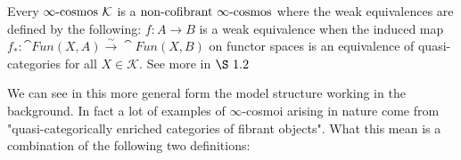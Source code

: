 \begin{rmk}\label{remarkabout}
    Every $\infty\text{-cosmos} \ \mathcal{K}$ is a $\text{non-cofibrant }\infty\text{-cosmos}$ where the weak equivalences are defined by the following: $f : A \rightarrow B$ is a weak equivalence when the induced map $f_*: \cat{Fun(X,A)}\stackrel{\sim}{\rightarrow} \cat{Fun(X,B)}$ on functor spaces is an equivalence of quasi-categories for all $X\in \mathcal{K}$. See more in \cite{RV-elements} $\S~1.2$
    
\end{rmk}

We can see in this more general form the model structure working in the background. In fact a lot of examples of $\infty$-cosmoi arising in nature come from "quasi-categorically enriched categories of fibrant objects". What this mean is a combination of the following two definitions:

